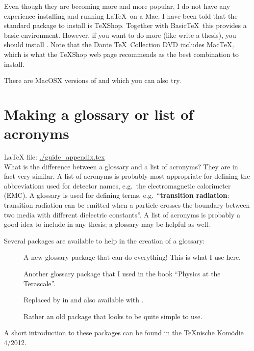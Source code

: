 Even though they are becoming more and more popular, I do not have any
experience installing and running \LaTeX\ on a Mac. I have been told
that the standard package to install is \TeX Shop. Together with
Basic\TeX\ this provides a basic
environment. However, if you want to do more (like write a thesis),
you should install \TeXLive. Note that the Dante \TeX\
Collection DVD includes Mac\TeX, which is what the \TeX Shop web page
recommends as the best combination to install.

There are MacOSX versions of \TeXstudio and \TeXmaker which you can
also try.


\chapter{Making a glossary or list of acronyms}
\label{sec:app:glossary}

\LaTeX{} file: \url{./guide_appendix.tex}\\[1ex]
\noindent
What is the difference between a glossary and a list of acronyms? They
are in fact very similar. A list of acronyms is probably most
appropriate for defining the abbreviations used for detector names,
e.g.\ the electromagnetic calorimeter (EMC). A glossary is used for
defining terms, e.g.\ \enquote{\textbf{transition radiation}: transition
radiation can be emitted when a particle crosses the boundary between
two media with different dielectric constants}. A list of acronyms is
probably a good idea to include in any thesis; a glossary may be
helpful as well.

Several packages are available to help in the creation of a glossary:
\begin{description}
\item[] A new glossary package that can do
  everything! This is what I use here.
\item[] Another glossary package that I used in the book
  \enquote{Physics at the Terascale}.
\item[] Replaced by  in
   and also available with .
\item[] Rather an old package that looks to be quite
  simple to use.
\end{description}

A short introduction to these packages can be found in the \TeX nische
Komödie 4/2012.

